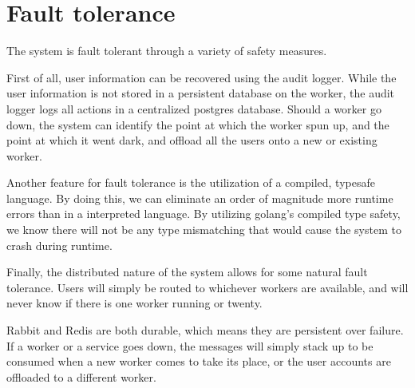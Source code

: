 \chapter{Fault tolerance}
The system is fault tolerant through a variety of safety measures.

First of all, user information can be recovered using the audit logger.
While the user information is not stored in a persistent database on the worker, the audit logger logs all actions in a centralized postgres database.
Should a worker go down, the system can identify the point at which the worker spun up, and the point at which it went dark, and offload all the users onto a new or existing worker.

Another feature for fault tolerance is the utilization of a compiled, typesafe language.
By doing this, we can eliminate an order of magnitude more runtime errors than in a interpreted language.
By utilizing golang’s compiled type safety, we know there will not be any type mismatching that would cause the system to crash during runtime.

Finally, the distributed nature of the system allows for some natural fault tolerance.
Users will simply be routed to whichever workers are available, and will never know if there is one worker running or twenty. 

Rabbit and Redis are both durable, which means they are persistent over failure.
If a worker or a service goes down, the messages will simply stack up to be consumed when a new worker comes to take its place, or the user accounts are offloaded to a different worker.
